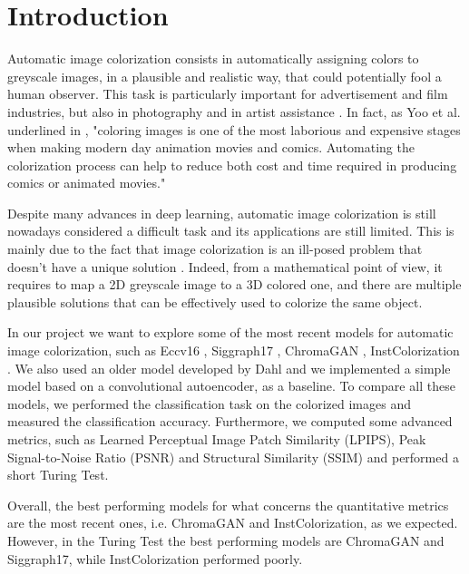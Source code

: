 \section{Introduction}
Automatic image colorization consists in automatically assigning colors to greyscale images, in a plausible and
realistic way, that could potentially fool a human observer. This task is particularly important for advertisement
and film industries, but also in photography and in artist assistance \cite{chromagan}.
In fact, as Yoo et al. underlined in \cite{animation}, "coloring images is one of the most laborious and expensive
stages when making modern day animation movies and comics. Automating the colorization process can help to reduce
both cost and time required in producing comics or animated movies."

Despite many advances in deep learning, automatic image colorization is still nowadays considered a difficult task
and its applications are still limited. This is mainly due to the fact that image colorization is an ill-posed
problem that doesn't have a unique solution \cite{su} \cite{chromagan}. Indeed, from a mathematical point of view,
it requires to map a 2D greyscale image to a 3D colored one, and there are multiple plausible solutions that can
be effectively used to colorize the same object.

In our project we want to explore some of the most recent models for automatic image colorization, such as
Eccv16 \cite{zhang}, Siggraph17 \cite{siggraph}, ChromaGAN \cite{chromagan}, InstColorization \cite{su}.
We also used an older model developed by Dahl \cite{dahl} and we implemented a simple model based on a
convolutional autoencoder, as a baseline.
To compare all these models, we performed the classification task on the colorized images and measured the
classification accuracy. Furthermore, we computed some advanced metrics, such as Learned Perceptual Image Patch
Similarity (LPIPS), Peak Signal-to-Noise Ratio (PSNR) and Structural Similarity (SSIM) and performed a short
Turing Test.

Overall, the best performing models for what concerns the quantitative metrics are the most recent ones,
i.e. ChromaGAN and InstColorization, as we expected. However, in the Turing Test the best performing models
are ChromaGAN and Siggraph17, while InstColorization performed poorly.




